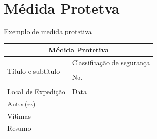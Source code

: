 \documentclass[
	12pt,				%
    oneside,			%
	a4paper,			%
	english,			%
	french,				%
	spanish,			%
	brazil,				%
	]{abntex2}
\begin{document}


\printindex

\chapter*[Médida Protetva]{Médida Protetva}
\label{formulado-identificacao}

Exemplo de medida protetiva

\bigskip

\begin{tabular}{|p{9cm}|p{5cm}|} %
\hline
\multicolumn{2}{|c|}{\textbf{\large Médida Protetiva}}\\
\hline
\multirow{4}{10cm}[24pt]{Título e subtítulo}& Classificação de segurança\\
                   & \\
                   \cline{2-2}
                   & No.\\
                   & \\
				
\hline
Local de Expedição & Data\\

\hline
\multicolumn{2}{|l|}{Autor(es)} \\

\hline
\multicolumn{2}{|l|}{Vítimas} \\
\hline
\multicolumn{2}{|l|}{Resumo}\\[3cm]
\hline

\end{tabular}
\end{document}
